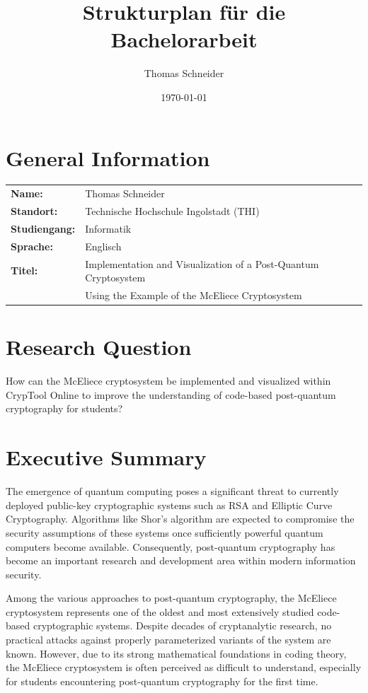 \documentclass[a4paper,11pt]{article}
\title{\color{thiblau}Strukturplan für die Bachelorarbeit}
\author{Thomas Schneider}
\date{\today}
\begin{document}
\maketitle

\section*{General Information}
\begin{tabular}{@{}ll}
	\textbf{Name:}      & Thomas Schneider \\
	\textbf{Standort:}  & Technische Hochschule Ingolstadt (THI) \\
	\textbf{Studiengang:} & Informatik \\
	\textbf{Sprache:}   & Englisch \\
	\textbf{Titel:}     & Implementation and Visualization of a Post-Quantum Cryptosystem \\
	                    & Using the Example of the McEliece Cryptosystem \\
\end{tabular}

\section*{Research Question}
How can the McEliece cryptosystem be implemented and visualized within CrypTool
Online to improve the understanding of code-based post-quantum cryptography for
students?

\section*{Executive Summary}
The emergence of quantum computing poses a significant threat to currently deployed
public-key cryptographic systems such as RSA and Elliptic Curve Cryptography.
Algorithms like Shor's algorithm are expected to compromise the security assumptions
of these systems once sufficiently powerful quantum computers become available.
Consequently, post-quantum cryptography has become an important research and
development area within modern information security.

Among the various approaches to post-quantum cryptography, the McEliece cryptosystem
represents one of the oldest and most extensively studied code-based cryptographic
systems. Despite decades of cryptanalytic research, no practical attacks against
properly parameterized variants of the system are known. However, due to its strong
mathematical foundations in coding theory, the McEliece cryptosystem is often
perceived as difficult to understand, especially for students encountering
post-quantum cryptography for the first time.
\end{document}
